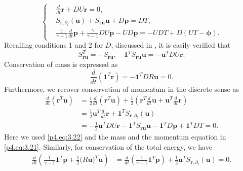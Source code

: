 \begin{equation} \label{p4.eq:3.21}
\left\{
\begin{aligned}
	& \frac{d}{dt} \mathbf r + DU\mathbf r = 0, \\
	& S_{\mathbf r,\partial_t} (\mathbf u) + S_{\mathbf r \mathbf u} \mathbf u + D \mathbf p = D T, \\
	&\frac{1}{\gamma -1} \frac{d}{dt} \mathbf p + \frac{\gamma}{\gamma -1} D U \mathbf p - UD\mathbf p = - UDT + D(UT - \mathbf \phi).
\end{aligned}
\right.
\end{equation}
Recalling conditions 1 and 2 for $D$, discussed in , it is easily verified that
\begin{equation} \label{p4.eq:3.22}
	S_{\mathbf r \mathbf u}^T = - S_{\mathbf r \mathbf u}, \quad \mathbf 1^T S_{\mathbf r \mathbf u} \mathbf u = - \mathbf u^T DU \mathbf r.
\end{equation}
Conservation of mass is expressed as
\begin{equation} \label{p4.eq:3.23}
	\frac{d}{dt} (\mathbf 1^T \mathbf r) = - \mathbf 1^T DR\mathbf u = 0. 
\end{equation}
Furthermore, we recover conservation of momentum in the discrete sense as
\begin{equation} \label{p4.eq:3.24}
\begin{aligned}
	\frac{d}{dt}(\mathbf r^T \mathbf u) &= \frac{1}{2} \frac{d}{dt}(\mathbf r^T \mathbf u) + \frac{1}{2} \left( \mathbf r^T \frac d{dt} \mathbf u +\mathbf u^T \frac{d}{dt} \mathbf r \right)\\
	&= \frac{1}{2}\mathbf u^T \frac d{dt} \mathbf r + \mathbf 1^T S_{\mathbf r,\partial_t} (\mathbf u) \\
	&= -\frac 1 2 \mathbf u^T DU \mathbf r  - \mathbf 1^T S_{\mathbf r \mathbf u} \mathbf u - \mathbf 1^T D\mathbf p +  \mathbf 1^T D T = 0.
\end{aligned}
\end{equation}
Here we used \eqref{p4.eq:3.22} and the mass and the momentum equation in \eqref{p4.eq:3.21}. Similarly, for conservation of the total energy, we have
\begin{equation} \label{p4.eq:3.25}
\begin{aligned}
	\frac{d}{dt} \left( \frac{1}{\gamma - 1} \mathbf 1^T \mathbf p + \frac 1 2 \mathbf (R\mathbf u)^T \mathbf u  \right) &= \frac{d}{dt} \left( \frac{1}{\gamma - 1} \mathbf 1^T \mathbf p \right) + \frac 1 2 \mathbf u^T  S_{\mathbf r,\partial_t} (\mathbf u) = 0.
\end{aligned}
\end{equation}
